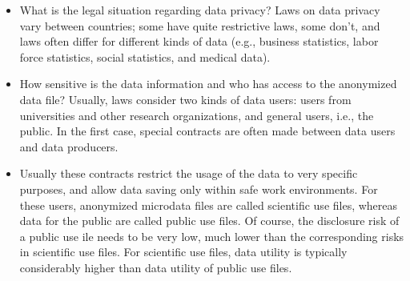 \documentclass[]{article}
\begin{document}
\begin{itemize}
\item What is the legal situation regarding data privacy? Laws on data privacy vary
between countries; some have quite restrictive laws, some don’t, and laws often
differ for different kinds of data (e.g., business statistics, labor force statistics,
social statistics, and medical data).


\item How sensitive is the data information and who has access to the anonymized
data file? Usually, laws consider two kinds of data users: users from universities
and other research organizations, and general users, i.e., the public. In the ﬁrst
case, special contracts are often made between data users and data producers.

\item Usually these contracts restrict the usage of the data to very speciﬁc purposes, and
allow data saving only within safe work environments. For these users, anonymized
microdata ﬁles are called scientiﬁc use ﬁles, whereas data for the public are called
public use ﬁles. Of course, the disclosure risk of a public use ile needs to be very
low, much lower than the corresponding risks in scientiﬁc use ﬁles. For scientiﬁc
use ﬁles, data utility is typically considerably higher than data utility of public use
ﬁles.
\end{itemize}
\end{document}

